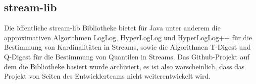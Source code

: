 \subsection{stream-lib}
Die öffentliche stream-lib Bibliotheke bietet für Java unter anderem die approximativen Algorithmen LogLog, 
HyperLogLog und HyperLogLog++ für die Bestimmung von Kardinalitäten in Streams, 
sowie die Algorithmen T-Digest und Q-Digest für die Bestimmung von Quantilen in Streams. 
Das Github-Projekt auf dem die Bibliotheke basiert wurde archiviert, 
es ist also warscheinlich, dass das Projekt von Seiten des Entwicklerteams nicht weiterentwickelt wird. 

